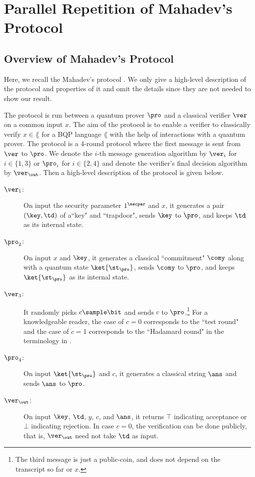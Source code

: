\section{Parallel Repetition of Mahadev's Protocol}

\subsection{Overview of Mahadev's Protocol}
Here, we recall the Mahadev's protocol \cite{FOCS:Mahadev18a}. We only give a high-level description of the protocol and properties of it and omit the details since they are not needed to show our result. 

The protocol is run between a quantum prover $\pro$ and a classical verifier $\ver$ on a common input $x$. The aim of the protocol is to enable a verifier to classically verify $x\in \lang$ for a BQP language $\lang$ with the help of interactions with a quantum prover.
The protocol is a 4-round protocol where the first message is sent from $\ver$ to $\pro$. 
We denote the $i$-th message generation algorithm by $\ver_i$ for $i\in\{1,3\}$ or $\pro_i$ for $i\in \{2,4\}$ and denote the verifier's final decision algorithm by $\ver_\out$.
Then a high-level description of the protocol is given below.
\begin{description}
\item[$\ver_1$:] On input the security parameter $1^\secpar$ and $x$, it generates a pair $(\key,\td)$ of a``key" and ``trapdoor", sends $\key$ to $\pro$, and keeps $\td$ as its internal state.
\item[$\pro_2$:] On input $x$ and $\key$, it generates a classical ``commitment" $\comy$ along with a quantum state $\ket{\st_\pro}$, sends $\comy$ to $\pro$, and keeps $\ket{\st_\pro}$ as its internal state.
\item[$\ver_3$:] It randomly picks $c\sample \bit$ and sends $c$ to $\pro$.\footnote{The third message is just a public-coin, and does not depend on the transcript so far or $x$.}
For a knowledgeable reader, the case of $c=0$ corresponds to the ``test round" and the case of $c=1$ corresponds to the ``Hadamard round" in the terminology in \cite{FOCS:Mahadev18a}.
\item[$\pro_4$:] On input $\ket{\st_\pro}$ and $c$, it generates a classical string $\ans$ and sends $\ans$ to $\pro$.
\item[$\ver_\out$:] On input $\key$, $\td$, $y$, $c$, and $\ans$, it returns $\top$ indicating acceptance or $\bot$ indicating rejection.
In case $c=0$, the verification can be done publicly, that is, $\ver_\out$ need not take $\td$ as input.
\end{description}

